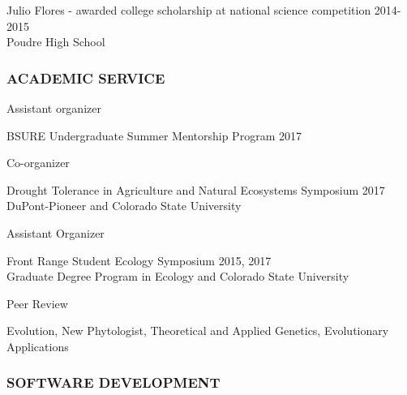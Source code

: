 \documentclass[12pt,english]{article}
\begin{document}
\hspace*{1.0em} Julio Flores - awarded college scholarship at national science competition 
\hfill 
2014-2015\\
\hspace*{2.0em} Poudre High School

\subsubsection*{ACADEMIC SERVICE}
\vspace{-0.5ex}\par

\hspace*{1.0em} Assistant organizer
\par
\hspace*{2.0em} BSURE Undergraduate Summer Mentorship Program
\hfill 
2017

\hspace*{1.0em} Co-organizer
\par
\hspace*{2.0em} Drought Tolerance in Agriculture and Natural Ecosystems Symposium
\hfill 
2017
\hspace*{2.0em} DuPont-Pioneer and Colorado State University
\par
\vspace{0.5em}
\hspace*{1.0em} Assistant Organizer
\par
\hspace*{2.0em} Front Range Student Ecology Symposium
\hfill 
2015, 2017\\
\hspace*{2.0em} Graduate Degree Program in Ecology and Colorado State University
\par
\hspace*{1.0em} Peer Review
\par
\hspace*{2.0em} Evolution, New Phytologist, Theoretical and Applied Genetics, Evolutionary Applications

\vspace{0.5em}\par



\subsubsection*{SOFTWARE DEVELOPMENT}
\vspace{-0.5ex}
\end{document}
